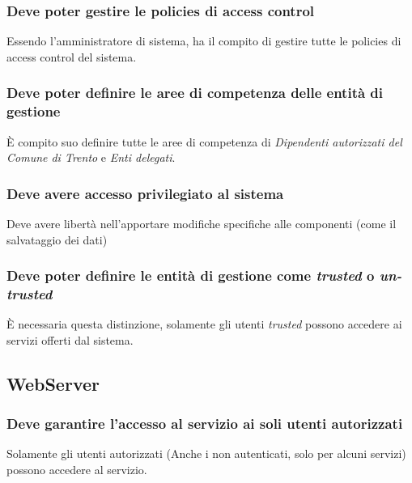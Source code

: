 \documentclass{article}
\begin{document}
\subsubsection{Deve poter gestire le policies di access control}
\label{5.5.1}
Essendo l'amministratore di sistema, ha il compito di gestire tutte le policies di access control del sistema.

\subsubsection{Deve poter definire le aree di competenza delle entità di gestione}
\label{5.5.2}
È compito suo definire tutte le aree di competenza di \textit{Dipendenti autorizzati del Comune di Trento} e \textit{Enti delegati}.

\subsubsection{Deve avere accesso privilegiato al sistema}
\label{5.5.3}
Deve avere libertà nell'apportare modifiche specifiche alle componenti (come il salvataggio dei dati)

\subsubsection{Deve poter definire le entità di gestione come \textit{trusted} o \textit{un-trusted}}
\label{5.5.4}
È necessaria questa distinzione, solamente gli utenti \textit{trusted} possono accedere ai servizi offerti dal sistema.

\subsection{WebServer}

\subsubsection{Deve garantire l'accesso al servizio ai soli utenti autorizzati}
\label{5.6.1}
Solamente gli utenti autorizzati (Anche i non autenticati, solo per alcuni servizi) possono accedere al servizio.
\end{document}
